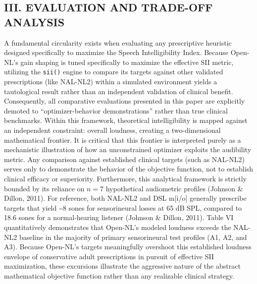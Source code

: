 \documentclass[
  12pt,
]{article}
\begin{document}
\subsection{III. EVALUATION AND TRADE-OFF
ANALYSIS}\label{iii.-evaluation-and-trade-off-analysis}

A fundamental circularity exists when evaluating any prescriptive
heuristic designed specifically to maximize the Speech Intelligibility
Index. Because Open-NL's gain shaping is tuned specifically to maximize
the effective SII metric, utilizing the \texttt{sii()} engine to compare
its targets against other validated prescriptions (like NAL-NL2) within
a simulated environment yields a tautological result rather than an
independent validation of clinical benefit. Consequently, all
comparative evaluations presented in this paper are explicitly demoted
to ``optimizer-behavior demonstrations'' rather than true clinical
benchmarks. Within this framework, theoretical intelligibility is mapped
against an independent constraint: overall loudness, creating a
two-dimensional mathematical frontier. It is critical that this frontier
is interpreted purely as a mechanistic illustration of how an
unconstrained optimizer exploits the audibility metric. Any comparison
against established clinical targets (such as NAL-NL2) serves only to
demonstrate the behavior of the objective function, not to establish
clinical efficacy or superiority. Furthermore, this analytical framework
is strictly bounded by its reliance on \(n=7\) hypothetical audiometric
profiles (Johnson \& Dillon, 2011). For reference, both NAL-NL2 and DSL
m{[}i/o{]} generally prescribe targets that yield \textasciitilde8 sones
for sensorineural losses at 65 dB SPL, compared to 18.6 sones for a
normal-hearing listener (Johnson \& Dillon, 2011). Table VI
quantitatively demonstrates that Open-NL's modeled loudness exceeds the
NAL-NL2 baseline in the majority of primary sensorineural test profiles
(A1, A2, and A3). Because Open-NL's targets meaningfully overshoot this
established loudness envelope of conservative adult prescriptions in
pursuit of effective SII maximization, these excursions illustrate the
aggressive nature of the abstract mathematical objective function rather
than any realizable clinical strategy.
\end{document}
